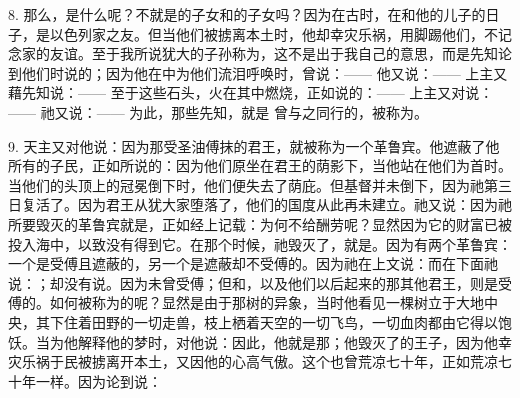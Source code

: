 8. 那么，是什么呢？不就是的子女和的子女吗？因为在古时，在和他的儿子的日子，是以色列家之友。但当他们被掳离本土时，他却幸灾乐祸，用脚踢他们，不记念家的友谊。至于我所说犹大的子孙称为，这不是出于我自己的意思，而是先知论到他们时说的；因为他在中为他们流泪呼唤时，曾说：——  他又说：——  上主又藉先知说：——  至于这些石头，火在其中燃烧，正如说的：——  上主又对说：——  祂又说：——  为此，那些先知，就是 曾与之同行的，被称为。\par

9. 天主又对他说：因为那受圣油傅抹的君王，就被称为一个革鲁宾。他遮蔽了他所有的子民，正如所说的：因为他们原坐在君王的荫影下，当他站在他们为首时。当他们的头顶上的冠冕倒下时，他们便失去了荫庇。但基督并未倒下，因为祂第三日复活了。因为君王从犹大家堕落了，他们的国度从此再未建立。祂又说：因为祂所要毁灭的革鲁宾就是，正如经上记载：为何不给酬劳呢？显然因为它的财富已被投入海中，以致没有得到它。在那个时候，祂毁灭了，就是。因为有两个革鲁宾：一个是受傅且遮蔽的，另一个是遮蔽却不受傅的。因为祂在上文说：而在下面祂说：；却没有说。因为未曾受傅；但和，以及他们以后起来的那其他君王，则是受傅的。如何被称为的呢？显然是由于那树的异象，当时他看见一棵树立于大地中央，其下住着田野的一切走兽，枝上栖着天空的一切飞鸟，一切血肉都由它得以饱饫。当为他解释他的梦时，对他说：因此，他就是那；他毁灭了的王子，因为他幸灾乐祸于民被掳离开本土，又因他的心高气傲。这个也曾荒凉七十年，正如荒凉七十年一样。因为论到说：\par

